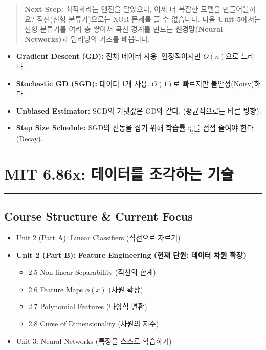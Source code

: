 \documentclass[11pt,a4paper]{book}
\theoremstyle{definition}
\begin{document}
\vspace{1cm}
\begin{quote}
\textbf{Next Step:} 최적화라는 엔진을 달았으니, 이제 더 복잡한 모델을 만들어볼까요? 직선(선형 분류기)으로는 XOR 문제를 풀 수 없습니다. 다음 \textbf{Unit 5}에서는 선형 분류기를 여러 층 쌓아서 곡선 경계를 만드는 \textbf{신경망(Neural Networks)}과 딥러닝의 기초를 배웁니다.
\end{quote}

\begin{summarybox}[title={Unit 4 핵심 요약}]
\begin{itemize}
    \item \textbf{Gradient Descent (GD):} 전체 데이터 사용. 안정적이지만 $O(n)$으로 느리다.
    \item \textbf{Stochastic GD (SGD):} 데이터 1개 사용. $O(1)$로 빠르지만 불안정(Noisy)하다.
    \item \textbf{Unbiased Estimator:} SGD의 기댓값은 GD와 같다. (평균적으로는 바른 방향).
    \item \textbf{Step Size Schedule:} SGD의 진동을 잡기 위해 학습률 $\eta_t$를 점점 줄여야 한다 (Decay).
\end{itemize}
\end{summarybox}


\chapter{MIT 6.86x: 데이터를 조각하는 기술}
\label{ch:lecture5}


\vspace{1cm}
\hrule
\vspace{1cm}

\section*{Course Structure \& Current Focus}
\begin{itemize}
    \item Unit 2 (Part A): Linear Classifiers (직선으로 자르기)
    \item \textbf{\textcolor{mainblue}{Unit 2 (Part B): Feature Engineering (현재 단원: 데이터 차원 확장)}}
    \begin{itemize}
        \item 2.5 Non-linear Separability (직선의 한계)
        \item 2.6 Feature Maps $\phi(x)$ (차원 확장)
        \item 2.7 Polynomial Features (다항식 변환)
        \item 2.8 Curse of Dimensionality (차원의 저주)
    \end{itemize}
    \item Unit 3: Neural Networks (특징을 스스로 학습하기)
\end{itemize}
\end{document}
